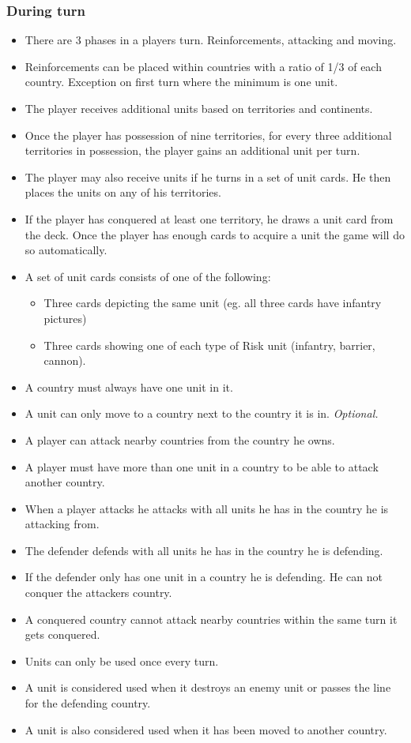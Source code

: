 \documentclass[12pt,a4paper]{article}
\begin{document}
\subsubsection{During turn}

\begin{itemize}
\item There are 3 phases in a players turn. Reinforcements, attacking
  and moving.
\item Reinforcements can be placed within countries with a ratio of
  1/3 of each country. Exception on first turn where the minimum is
  one unit.
\item The player receives additional units based on territories and
  continents.
\item Once the player has possession of nine territories, for every
  three additional territories in possession, the player gains an
  additional unit per turn.
\item The player may also receive units if he turns in a set of unit
  cards. He then places the units on any of his territories.
\item If the player has conquered at least one territory, he draws a
  unit card from the deck. Once the player has enough cards to acquire
  a unit the game will do so automatically.
\item A set of unit cards consists of one of the following:
  \begin{itemize}
  \item Three cards depicting the same unit (eg. all three cards have
    infantry pictures)
  \item Three cards showing one of each type of Risk unit (infantry,
    barrier, cannon).
  \end{itemize}
\item A country must always have one unit in it.
\item A unit can only move to a country next to the country it is
  in. \emph{Optional.}
\item A player can attack nearby countries from the country he owns.
\item A player must have more than one unit in a country to be able to
  attack another country.
\item When a player attacks he attacks with all units he has in the
  country he is attacking from.
\item The defender defends with all units he has in the country he is defending.
\item If the defender only has one unit in a country he is
  defending. He can not conquer the attackers country.
\item A conquered country cannot attack nearby countries within the
  same turn it gets conquered.
\item Units can only be used once every turn.
\item A unit is considered used when it destroys an enemy unit or
  passes the line for the defending country.
\item A unit is also considered used when it has been moved to another
  country.
\end{itemize}
\end{document}
